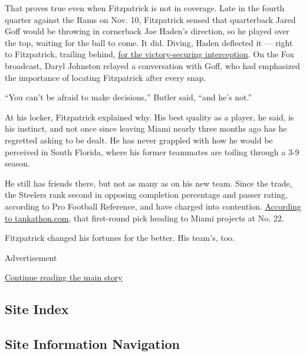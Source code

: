 That proves true even when Fitzpatrick is not in coverage. Late in the
fourth quarter against the Rams on Nov. 10, Fitzpatrick sensed that
quarterback Jared Goff would be throwing in cornerback Joe Haden's
direction, so he played over the top, waiting for the ball to come. It
did. Diving, Haden deflected it --- right to Fitzpatrick, trailing
behind,
\href{https://twitter.com/NFL/status/1193694265152401409?ref_src=twsrc\%5Etfw\%7Ctwcamp\%5Etweetembed\%7Ctwterm\%5E1193694265152401409\&ref_url=https\%3A\%2F\%2Fwww.theringer.com\%2Fnfl\%2F2019\%2F11\%2F10\%2F20958753\%2Fpittsburgh-steelers-los-angeles-rams-minkah-fitzpatrick-tj-watt}{for
the victory-securing interception}. On the Fox broadcast, Daryl Johnston
relayed a conversation with Goff, who had emphasized the importance of
locating Fitzpatrick after every snap.

``You can't be afraid to make decisions,'' Butler said, ``and he's
not.''

At his locker, Fitzpatrick explained why. His best quality as a player,
he said, is his instinct, and not once since leaving Miami nearly three
months ago has he regretted asking to be dealt. He has never grappled
with how he would be perceived in South Florida, where his former
teammates are toiling through a 3-9 season.

He still has friends there, but not as many as on his new team. Since
the trade, the Steelers rank second in opposing completion percentage
and passer rating, according to Pro Football Reference, and have charged
into contention. \href{http://www.tankathon.com/nfl}{According to
tankathon.com}, that first-round pick heading to Miami projects at No.
22.

Fitzpatrick changed his fortunes for the better. His team's, too.

Advertisement

\protect\hyperlink{after-bottom}{Continue reading the main story}

\hypertarget{site-index}{%
\subsection{Site Index}\label{site-index}}

\hypertarget{site-information-navigation}{%
\subsection{Site Information
Navigation}\label{site-information-navigation}}

